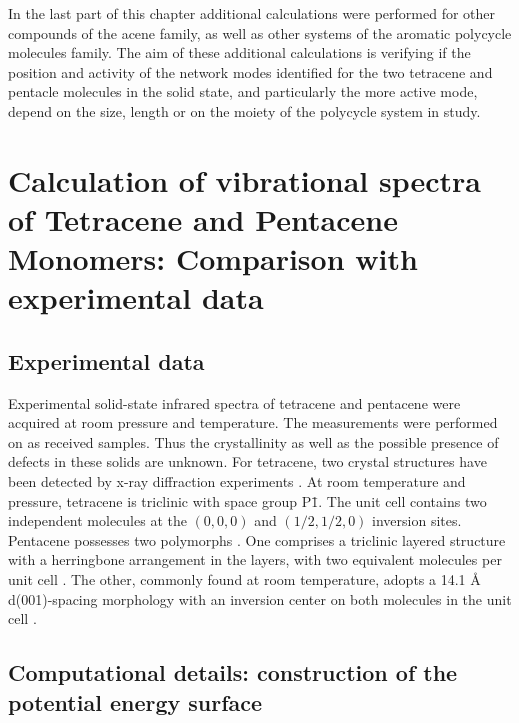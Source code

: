 In the last part of this chapter additional calculations were performed for other compounds of the acene family, as well as other systems of the aromatic polycycle molecules family. The aim of these additional calculations is verifying if the position and activity of the network modes identified for the two tetracene and pentacle molecules in the solid state, and particularly the more active mode, depend on the size, length or on the moiety of the polycycle system in study.\\



\section{Calculation of vibrational spectra of Tetracene and Pentacene Monomers: Comparison with experimental data}

\subsection{Experimental data}

Experimental solid-state infrared spectra of tetracene and pentacene \cite{michaelian2012far} were acquired at room pressure and temperature. The measurements were performed on as received samples. Thus the crystallinity as well as the possible presence of defects in these solids are unknown. For tetracene, two crystal structures have been detected by x-ray diffraction experiments \cite{venuti2004phonons}. At room temperature and pressure, tetracene is triclinic \cite{campbell1962crystal} with space group P\={1}. The unit cell contains two independent molecules at the $(0,0,0)$ and $(1/2,1/2,0)$ inversion sites. Pentacene possesses two polymorphs \cite{campbell1961crystal,mattheus2001polymorphism}. One comprises a triclinic layered structure with a herringbone arrangement in the layers, with two equivalent molecules per unit cell \cite{campbell1961crystal}.  The other, commonly found at room temperature, adopts a 14.1 Å d(001)-spacing morphology with an inversion center on both molecules in the unit cell \cite{holmes1999nature,siegrist2001enhanced,mattheus2001polymorphism,mattheus2003identification,mattheus2003modeling}.

\subsection{Computational details: construction of the potential energy surface}


